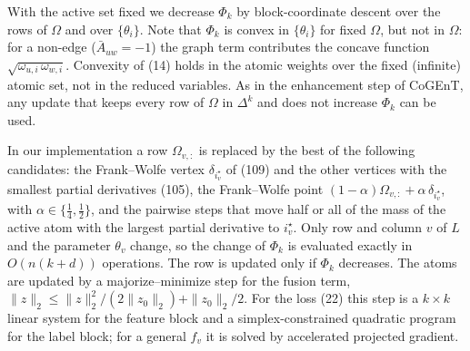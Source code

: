 
With the active set fixed we decrease $\Phi_k$ by block-coordinate descent over the rows of
$\Omega$ and over $\{\theta_i\}$. Note that $\Phi_k$ is convex in $\{\theta_i\}$ for fixed $\Omega$,
but not in $\Omega$: for a non-edge ($\bar A_{uw}=-1$) the graph term contributes the concave
function $\sqrt{\omega_{u,i}\,\omega_{w,i}}$. Convexity of (14) holds in the atomic weights over the
fixed (infinite) atomic set, not in the reduced variables. As in the enhancement step of CoGEnT,
any update that keeps every row of $\Omega$ in $\Delta^k$ and does not increase $\Phi_k$ can be used.

In our implementation a row $\Omega_{v,:}$ is replaced by the best of the following candidates:
the Frank--Wolfe vertex $\delta_{i^\star_v}$ of (109) and the other vertices with the smallest
partial derivatives (105), the Frank--Wolfe point $(1-\alpha)\Omega_{v,:}+\alpha\,\delta_{i^\star_v}$,
with $\alpha\in\{\tfrac14,\tfrac12\}$, and the pairwise steps that move half or all of the mass of
the active atom with the largest partial derivative to $i^\star_v$. Only row and column $v$ of $L$ and the parameter $\theta_v$ change, so the
change of $\Phi_k$ is evaluated exactly in $O(n(k+d))$ operations. The row is updated only if
$\Phi_k$ decreases. The atoms are updated by a majorize--minimize step for the fusion term,
$\|z\|_2\le \|z\|_2^2/(2\|z_0\|_2)+\|z_0\|_2/2$. For the loss (22) this step is a $k\times k$
linear system for the feature block and a simplex-constrained quadratic program for the
label block; for a general $f_v$ it is solved by accelerated projected gradient.

